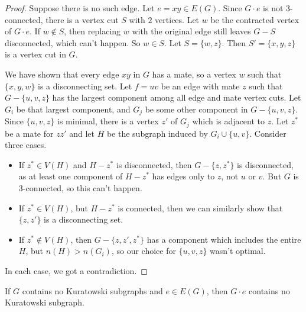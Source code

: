 \begin{proof}
  Suppose there is no such edge.
  Let $e = xy \in E(G)$.
  Since $G \cdot e$ is not $3$-connected, there is a vertex cut $S$ with $2$
  vertices.
  Let $w$ be the contracted vertex of $G \cdot e$.
  If $w \notin S$, then replacing $w$ with the original edge still leaves $G-S$
  disconnected, which can't happen.
  So $w \in S$.
  Let $S = \{w,z\}$.
  Then $S' = \{x,y,z\}$ is a vertex cut in $G$.

  We have shown that every edge $xy$ in $G$ has a mate, so a vertex $w$ such
  that $\{x,y,w\}$ is a disconnecting set.
  Let $f = uv$ be an edge with mate $z$ such that $G - \{u,v,z\}$ has the
  largest component among all edge and mate vertex cuts.
  Let $G_i$ be that largest component, and $G_j$ be some other component in $G -
  \{u,v,z\}$.
  Since $\{u,v,z\}$ is minimal, there is a vertex $z'$ of $G_j$ which is
  adjacent to $z$.
  Let $z^*$ be a mate for $zz'$ and let $H$ be the subgraph induced by $G_i \cup
  \{u,v\}$.
  Consider three cases.
  \begin{itemize}
  \item If $z^* \in V(H)$ and $H - z^*$ is disconnected, then $G - \{z,z^*\}$ is
	disconnected, as at least one component of $H - z^*$ has edges only to $z$,
	not $u$ or $v$.
	But $G$ is $3$-connected, so this can't happen.
  \item If $z^* \in V(H)$, but $H - z^*$ is connected, then we can similarly
	show that $\{z,z'\}$ is a disconnecting set.
  \item If $z^* \notin V(H)$, then $G - \{z,z',z^*\}$ has a component which
	includes the entire $H$, but $n(H) > n(G_i)$, so our choice for $\{u,v,z\}$
	wasn't optimal.
  \end{itemize}
  In each case, we got a contradiction.
\end{proof}


\begin{lemma}
  \label{lemma:tg-kuratowski-6}
  If $G$ contains no Kuratowski subgraphs and $e \in E(G)$, then $G \cdot e$
  contains no Kuratowski subgraph.
\end{lemma}

